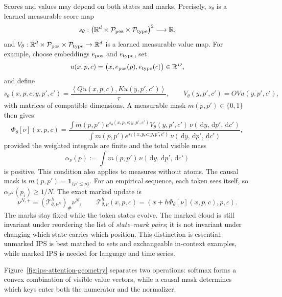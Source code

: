\documentclass[11pt]{amsart}
\numberwithin{equation}{section}
\theoremstyle{plain}
\newcommand{\R}{\mathbb{R}}
\newcommand{\dd}{\,\mathrm{d}}
\newcommand{\ip}[2]{\left\langle#1,#2\right\rangle}
\newcommand{\one}{\mathbf{1}}
\begin{document}
Scores and values may depend on both states and marks.
Precisely, $s_\theta$ is a learned measurable score map
\[
 s_\theta:
 \bigl(\R^d\times\mathcal P_{\rm pos}\times\mathcal P_{\rm type}\bigr)^2
 \longrightarrow\R,
\]
and
$V_\theta:\R^d\times\mathcal P_{\rm pos}\times\mathcal P_{\rm type}
\to\R^d$ is a learned measurable value map.  For example, choose embeddings
$e_{\rm pos}$ and $e_{\rm type}$, set
\[
 u(x,p,c)=\bigl(x,e_{\rm pos}(p),e_{\rm type}(c)\bigr)\in\R^D,
\]
and define
\[
 s_\theta(x,p,c;y,p',c')
 =\frac{\ip{Qu(x,p,c)}{Ku(y,p',c')}}{\tau},
 \qquad
 V_\theta(y,p',c')=OVu(y,p',c'),
\]
with matrices of compatible dimensions.  A measurable mask
$m(p,p')\in\{0,1\}$ then gives
\begin{equation}\label{eq:masked-field}
  \Phi_\theta[\nu](x,p,c)
  =\frac{\int m(p,p')e^{s_\theta(x,p,c;y,p',c')}
                   V_\theta(y,p',c')
     \,\nu(\dd y,\dd p',\dd c')}
    {\int m(p,p')e^{s_\theta(x,p,c;y,p',c')}
     \,\nu(\dd y,\dd p',\dd c')},
\end{equation}
provided the weighted integrals are finite and the total visible mass
\[
 \alpha_\nu(p):=\int m(p,p')\,\nu(\dd y,\dd p',\dd c')
\]
is positive.  This condition also applies to measures without atoms.  The
causal mask is $m(p,p')=\one_{\{p'\leq p\}}$.  For an empirical sequence,
each token sees itself, so $\alpha_{\nu^N}(p_i)\geq1/N$.
The exact marked update is
\[
 \nu^{N,+}=(\mathcal T_{\theta,\nu^N}^h)_\#\nu^N,
 \qquad
 \mathcal T_{\theta,\nu}^h(x,p,c)
 =(x+h\Phi_\theta[\nu](x,p,c),p,c).
\]
The marks stay fixed while the token states evolve.
The marked cloud is still invariant under
reordering the list of \emph{state--mark pairs}; it is not invariant under
changing which state carries which position.  This distinction is essential:
unmarked IPS is best matched to sets and exchangeable in-context examples,
while marked IPS is needed for language and time series.

Figure~\ref{fig:ips-attention-geometry} separates two operations:
softmax forms a convex combination of visible value vectors, while a causal
mask determines which keys enter both the numerator and the normalizer.
\end{document}
